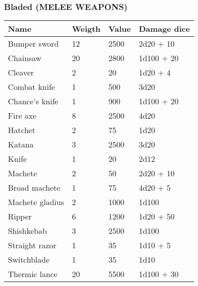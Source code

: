 
\subsubsection{Bladed (MELEE WEAPONS)}
\begin{longtable}{|p{4cm}|p{1.5cm}|p{1.5cm}|p{4cm}|}
\hline
\bfseries Name &  \bfseries Weigth & \bfseries Value & \bfseries Damage dice \\
\hline
\endhead
Bumper sword  & 12 & 2500 & 2d20 + 10 \\
Chainsaw & 20 & 2800 & 1d100 + 20 \\
Cleaver  & 2 & 20 & 1d20 + 4 \\
Combat knife  & 1 & 500 & 3d20 \\
Chance's knife  & 1 & 900 & 1d100 + 20 \\
Fire axe  & 8 & 2500 & 4d20 \\
Hatchet  & 2 & 75 & 1d20 \\
Katana  & 3 & 2500 & 3d20 \\
Knife  & 1 & 20 & 2d12 \\
Machete  & 2 & 50 & 2d20 + 10 \\
Broad machete  & 1 & 75 & 4d20 + 5 \\
Machete gladius  & 2 & 1000 & 1d100  \\
Ripper  & 6 & 1200 & 1d20 + 50 \\
Shishkebab  & 3 & 2500 & 1d100 \\
Straight razor  & 1 & 35 & 1d10 + 5 \\
Switchblade  & 1 & 35 & 1d10 \\
Thermic lance  & 20 & 5500 & 1d100 + 30 \\
\hline
\end{longtable}
